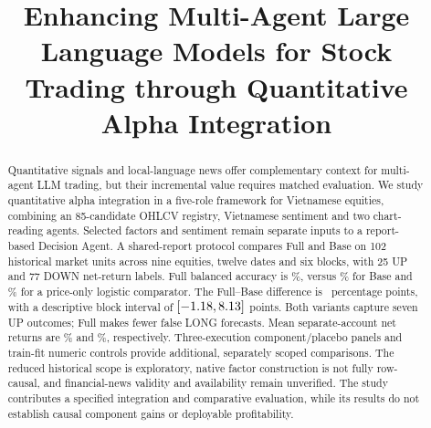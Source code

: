 \documentclass[preprint,12pt]{elsarticle}
\begin{document}
\begin{frontmatter}


\title{Enhancing Multi-Agent Large Language Models for Stock Trading through Quantitative Alpha Integration}







\begin{abstract}
Quantitative signals and local-language news offer complementary context for multi-agent LLM trading, but their incremental value requires matched evaluation. We study quantitative alpha integration in a five-role framework for Vietnamese equities, combining an 85-candidate OHLCV registry, Vietnamese sentiment and two chart-reading agents. Selected factors and sentiment remain separate inputs to a report-based Decision Agent. A shared-report protocol compares Full and Base on 102 historical market units across nine equities, twelve dates and six blocks, with 25 UP and 77 DOWN net-return labels. Full balanced accuracy is \FullBA\%, versus \BaseBA\% for Base and \LogisticPriceBA\% for a price-only logistic comparator. The Full--Base difference is \DeltaBA\ percentage points, with a descriptive block interval of $[-1.18,8.13]$ points. Both variants capture seven UP outcomes; Full makes fewer false LONG forecasts. Mean separate-account net returns are \FullReturn\% and \BaseReturn\%, respectively. Three-execution component/placebo panels and train-fit numeric controls provide additional, separately scoped comparisons. The reduced historical scope is exploratory, native factor construction is not fully row-causal, and financial-news validity and availability remain unverified. The study contributes a specified integration and comparative evaluation, while its results do not establish causal component gains or deployable profitability.
\end{abstract}


\end{frontmatter}
\end{document}
